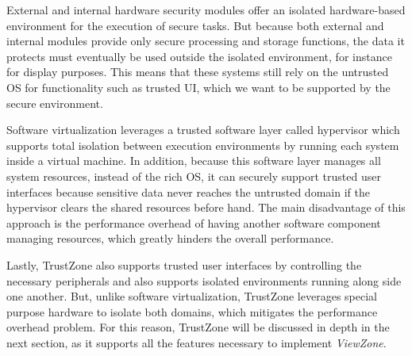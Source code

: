 External and internal hardware security modules offer an isolated hardware-based environment for the execution of secure tasks. But because both external and internal modules provide only secure processing and storage functions, the data it protects must eventually be used outside the isolated environment, for instance for display purposes. This means that these systems still rely on the untrusted OS for functionality such as trusted UI, which we want to be supported by the secure environment.

Software virtualization leverages a trusted software layer called hypervisor which supports total isolation between execution environments by running each system inside a virtual machine. In addition, because this software layer manages all system resources, instead of the rich OS, it can securely support trusted user interfaces because sensitive data never reaches the untrusted domain if the hypervisor clears the shared resources before hand. The main disadvantage of this approach is the performance overhead of having another software component managing resources, which greatly hinders the overall performance.

Lastly, TrustZone also supports trusted user interfaces by controlling the necessary peripherals and also supports isolated environments running along side one another. But, unlike software virtualization, TrustZone leverages special purpose hardware to isolate both domains, which mitigates the performance overhead problem. For this reason, TrustZone will be discussed in depth in the next section, as it supports all the features necessary to implement \emph{ViewZone}. 

